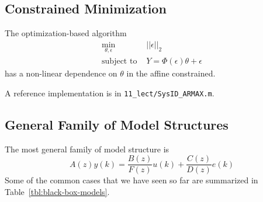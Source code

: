 \subsection{Constrained Minimization}
\label{sec:ARMAX-minimization}

The optimization-based algorithm
\begin{equation*}
  \begin{aligned}
    \min_{\theta,\epsilon}\ & ||\epsilon||_2 \\
    \textrm{subject to } & Y = \Phi(\epsilon)\theta + \epsilon
  \end{aligned}
\end{equation*}
has a non-linear dependence on $\theta$ in the affine constrained.


\iffalse
\begin{lstlisting}[
style=Matlab-editor,
basicstyle=\mlttfamily\small]

PhiTyu = [toeplitz(u(1:end-1), [u(1); 0]), ...
    toeplitz(-y(1:end-1), [-y(1); 0])];

[x,fval] = fmincon(@(x) ARMAXobjective(x),x0, ...
    [],[],[],[],[],[],@(x)ARMAXconstraint(x,y,PhiTyu));

function f = ARMAXobjective(x) % x = [theta; e]
f = norm(x(7:end), 2);
end

function [c,ceq] = ARMAXconstraint(x,y,PhiTyu)
theta = x(1:6);
e = x(7:end);
PhiTe = toeplitz(e(1:end-1), [e(1); 0]);
ceq = y(2:end) - [PhiTyu, PhiTe] * theta - e(2:end);
c = [];
end
\end{lstlisting}
\fi

A reference implementation is in \texttt{11\_lect/SysID\_ARMAX.m}.

\subsection{General Family of Model Structures}
\label{sec:general-family-models}

The most general family of model structure is~\cite[Sect.~4]{ljung}
\begin{equation}
  \label{eq:general-family-models}
  A(z)y(k) = \frac{B(z)}{F(z)}u(k) + \frac{C(z)}{D(z)}e(k)
\end{equation}
Some of the common cases that we have seen so far are summarized in Table~\ref{tbl:black-box-models}.

